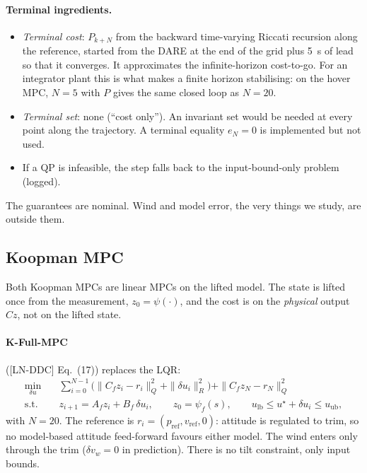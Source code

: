 \documentclass[11pt,a4paper]{article}
\newcommand{\KFullMPC}{\textsf{K-Full-MPC}}   %
\begin{document}
	\paragraph{Terminal ingredients.}
	\begin{itemize}[leftmargin=*]
		\item \emph{Terminal cost}: $P_{k+N}$ from the backward time-varying Riccati recursion along
		the reference, started from the DARE at the end of the grid plus 5~s of lead so that it
		converges. It approximates the infinite-horizon cost-to-go. For an integrator plant this is
		what makes a finite horizon stabilising: on the hover MPC, $N = 5$ with $P$ gives the same closed
		loop as $N = 20$.
		\item \emph{Terminal set}: none (``cost only''). An invariant set would be needed at every point
		along the trajectory. A terminal equality $e_N = 0$ is implemented but not used.
		\item If a QP is infeasible, the step falls back to the input-bound-only problem (logged).
	\end{itemize}
	The guarantees are nominal. Wind and model error, the very things we study, are outside them.

	\subsection{Koopman MPC}
	\label{sec:koopman-mpc}

	Both Koopman MPCs are linear MPCs on the lifted model. The state is lifted once from the
	measurement, $z_0 = \psi(\cdot)$, and the cost is on the \emph{physical} output $Cz$, not on the
	lifted state.

	\paragraph{\KFullMPC{}} ([LN-DDC] Eq.~(17)) replaces the LQR:
	\begin{align}
		\min_{\delta u} \quad & \sum_{i=0}^{N-1} \bigl( \|C_f z_i - r_i\|_Q^2 + \|\delta u_i\|_R^2 \bigr)
		+ \|C_f z_N - r_N\|_Q^2 \\
		\text{s.t.} \quad & z_{i+1} = A_f z_i + B_f\, \delta u_i, \qquad z_0 = \psi_f(s), \qquad
		u_{\text{lb}} \le u^\star + \delta u_i \le u_{\text{ub}},
	\end{align}
	with $N = 20$. The reference is $r_i = (p_{\text{ref}}, v_{\text{ref}}, 0)$: attitude is regulated
	to trim, so no model-based attitude feed-forward favours either model. The wind enters only
	through the trim ($\delta v_w = 0$ in prediction). There is no tilt constraint, only input bounds.
\end{document}
